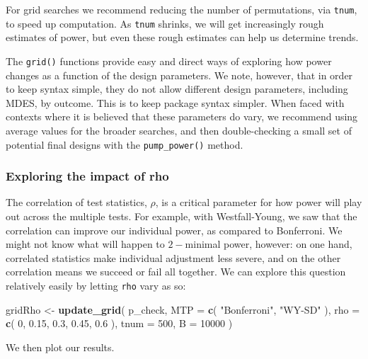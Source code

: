 \documentclass[
]{article}
\newenvironment{Shaded}{\begin{snugshade}}{\end{snugshade}}
\newcommand{\DataTypeTok}[1]{\textcolor[rgb]{0.13,0.29,0.53}{#1}}
\newcommand{\DecValTok}[1]{\textcolor[rgb]{0.00,0.00,0.81}{#1}}
\newcommand{\FloatTok}[1]{\textcolor[rgb]{0.00,0.00,0.81}{#1}}
\newcommand{\KeywordTok}[1]{\textcolor[rgb]{0.13,0.29,0.53}{\textbf{#1}}}
\newcommand{\NormalTok}[1]{#1}
\newcommand{\StringTok}[1]{\textcolor[rgb]{0.31,0.60,0.02}{#1}}
\begin{document}
For grid searches we recommend reducing the number of permutations, via
\texttt{tnum}, to speed up computation. As \texttt{tnum} shrinks, we
will get increasingly rough estimates of power, but even these rough
estimates can help us determine trends.

The \texttt{grid()} functions provide easy and direct ways of exploring
how power changes as a function of the design parameters. We note,
however, that in order to keep syntax simple, they do not allow
different design parameters, including MDES, by outcome. This is to keep
package syntax simpler. When faced with contexts where it is believed
that these parameters do vary, we recommend using average values for the
broader searches, and then double-checking a small set of potential
final designs with the \texttt{pump\_power()} method.

\subsubsection{Exploring the impact of rho}

The correlation of test statistics, \(\rho\), is a critical parameter
for how power will play out across the multiple tests. For example, with
Westfall-Young, we saw that the correlation can improve our individual
power, as compared to Bonferroni. We might not know what will happen to
\(2-\)minimal power, however: on one hand, correlated statistics make
individual adjustment less severe, and on the other correlation means we
succeed or fail all together. We can explore this question relatively
easily by letting \texttt{rho} vary as so:

\begin{Shaded}
\begin{Highlighting}[]
\NormalTok{gridRho \textless{}{-}}\StringTok{ }\KeywordTok{update\_grid}\NormalTok{( p\_check,}
            \DataTypeTok{MTP =} \KeywordTok{c}\NormalTok{( }\StringTok{"Bonferroni"}\NormalTok{, }\StringTok{"WY{-}SD"}\NormalTok{ ),}
            \DataTypeTok{rho =} \KeywordTok{c}\NormalTok{( }\DecValTok{0}\NormalTok{, }\FloatTok{0.15}\NormalTok{, }\FloatTok{0.3}\NormalTok{, }\FloatTok{0.45}\NormalTok{, }\FloatTok{0.6}\NormalTok{ ),}
            \DataTypeTok{tnum =} \DecValTok{500}\NormalTok{,}
            \DataTypeTok{B =} \DecValTok{10000}\NormalTok{ )}
\end{Highlighting}
\end{Shaded}

We then plot our results.
\end{document}
